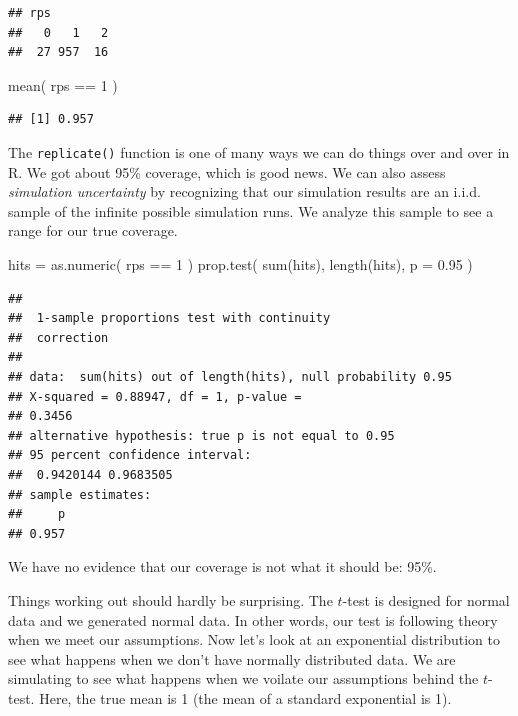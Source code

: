 \documentclass[
]{book}
\newenvironment{Shaded}{\begin{snugshade}}{\end{snugshade}}
\newcommand{\AttributeTok}[1]{\textcolor[rgb]{0.77,0.63,0.00}{#1}}
\newcommand{\DecValTok}[1]{\textcolor[rgb]{0.00,0.00,0.81}{#1}}
\newcommand{\FloatTok}[1]{\textcolor[rgb]{0.00,0.00,0.81}{#1}}
\newcommand{\FunctionTok}[1]{\textcolor[rgb]{0.00,0.00,0.00}{#1}}
\newcommand{\NormalTok}[1]{#1}
\newcommand{\OtherTok}[1]{\textcolor[rgb]{0.56,0.35,0.01}{#1}}
\newcommand{\SpecialCharTok}[1]{\textcolor[rgb]{0.00,0.00,0.00}{#1}}
\begin{document}
\begin{verbatim}
## rps
##   0   1   2 
##  27 957  16
\end{verbatim}

\begin{Shaded}
\begin{Highlighting}[]
\FunctionTok{mean}\NormalTok{( rps }\SpecialCharTok{==} \DecValTok{1}\NormalTok{ )}
\end{Highlighting}
\end{Shaded}

\begin{verbatim}
## [1] 0.957
\end{verbatim}

The \texttt{replicate()} function is one of many ways we can do things over and over in R.
We got about 95\% coverage, which is good news. We can also assess
\emph{simulation uncertainty} by recognizing that our simulation results are an
i.i.d. sample of the infinite possible simulation runs. We analyze this
sample to see a range for our true coverage.

\begin{Shaded}
\begin{Highlighting}[]
\NormalTok{hits }\OtherTok{=} \FunctionTok{as.numeric}\NormalTok{( rps }\SpecialCharTok{==} \DecValTok{1}\NormalTok{ )}
\FunctionTok{prop.test}\NormalTok{( }\FunctionTok{sum}\NormalTok{(hits), }\FunctionTok{length}\NormalTok{(hits), }\AttributeTok{p =} \FloatTok{0.95}\NormalTok{ )}
\end{Highlighting}
\end{Shaded}

\begin{verbatim}
## 
##  1-sample proportions test with continuity
##  correction
## 
## data:  sum(hits) out of length(hits), null probability 0.95
## X-squared = 0.88947, df = 1, p-value =
## 0.3456
## alternative hypothesis: true p is not equal to 0.95
## 95 percent confidence interval:
##  0.9420144 0.9683505
## sample estimates:
##     p 
## 0.957
\end{verbatim}

We have no evidence that our coverage is not what it should be: 95\%.

Things working out should hardly be surprising. The \(t\)-test is designed for
normal data and we generated normal data. In other words, our test is
following theory when we meet our assumptions. Now let's look at an
exponential distribution to see what happens when we don't have normally
distributed data. We are simulating to see what happens when we voilate
our assumptions behind the \(t\)-test. Here, the true mean is 1 (the mean of a
standard exponential is 1).
\end{document}
